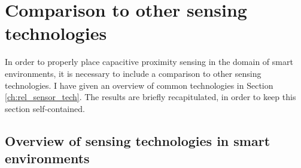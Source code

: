 \section{Comparison to other sensing technologies}
\label{ch:sens_compare}
In order to properly place capacitive proximity sensing in the domain of smart environments, it is necessary to include a comparison to other sensing technologies. I have given an overview of common technologies in Section \ref{ch:rel_sensor_tech}. The results are briefly recapitulated, in order to keep this section self-contained. 

\subsection{Overview of sensing technologies in smart environments}

